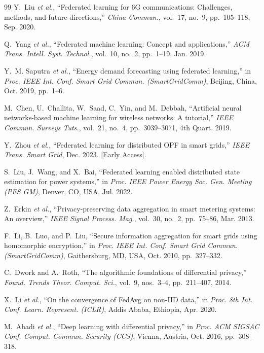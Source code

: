 \documentclass[journal,10pt]{IEEEtran}
\begin{document}
\begin{thebibliography}{99}
Y.~Liu \emph{et al.}, ``Federated learning for 6G communications: Challenges, methods, and future directions,'' \emph{China Commun.}, vol.~17, no.~9, pp.~105--118, Sep. 2020.

Q.~Yang \emph{et al.}, ``Federated machine learning: Concept and applications,'' \emph{ACM Trans. Intell. Syst. Technol.}, vol.~10, no.~2, pp.~1--19, Jan. 2019.

Y.~M. Saputra \emph{et al.}, ``Energy demand forecasting using federated learning,'' in \emph{Proc. IEEE Int. Conf. Smart Grid Commun. (SmartGridComm)}, Beijing, China, Oct. 2019, pp.~1--6.

M.~Chen, U.~Challita, W.~Saad, C.~Yin, and M.~Debbah, ``Artificial neural networks-based machine learning for wireless networks: A tutorial,'' \emph{IEEE Commun. Surveys Tuts.}, vol.~21, no.~4, pp.~3039--3071, 4th Quart. 2019.

Y.~Zhou \emph{et al.}, ``Federated learning for distributed OPF in smart grids,'' \emph{IEEE Trans. Smart Grid}, Dec. 2023. [Early Access].

S.~Liu, J.~Wang, and X.~Bai, ``Federated learning enabled distributed state estimation for power systems,'' in \emph{Proc. IEEE Power Energy Soc. Gen. Meeting (PES GM)}, Denver, CO, USA, Jul. 2022.

Z.~Erkin \emph{et al.}, ``Privacy-preserving data aggregation in smart metering systems: An overview,'' \emph{IEEE Signal Process. Mag.}, vol.~30, no.~2, pp.~75--86, Mar. 2013.

F.~Li, B.~Luo, and P.~Liu, ``Secure information aggregation for smart grids using homomorphic encryption,'' in \emph{Proc. IEEE Int. Conf. Smart Grid Commun. (SmartGridComm)}, Gaithersburg, MD, USA, Oct. 2010, pp.~327--332.

C.~Dwork and A.~Roth, ``The algorithmic foundations of differential privacy,'' \emph{Found. Trends Theor. Comput. Sci.}, vol.~9, nos.~3--4, pp.~211--407, 2014.

X.~Li \emph{et al.}, ``On the convergence of FedAvg on non-IID data,'' in \emph{Proc. 8th Int. Conf. Learn. Represent. (ICLR)}, Addis Ababa, Ethiopia, Apr. 2020.

M.~Abadi \emph{et al.}, ``Deep learning with differential privacy,'' in \emph{Proc. ACM SIGSAC Conf. Comput. Commun. Security (CCS)}, Vienna, Austria, Oct. 2016, pp.~308--318.


\end{thebibliography}
\end{document}

